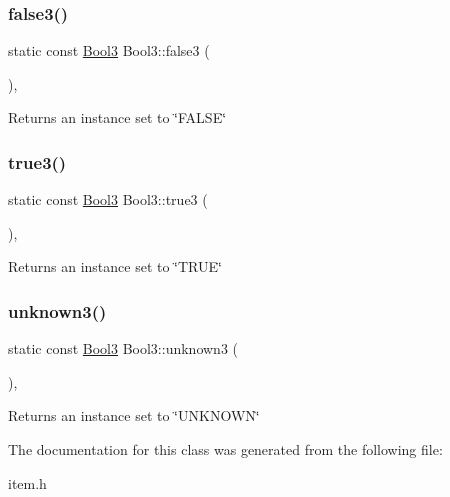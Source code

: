 \subsubsection{\texorpdfstring{false3()}{false3()}}
{\footnotesize\ttfamily static const \mbox{\hyperlink{classBool3}{Bool3}} Bool3\+::false3 (\begin{DoxyParamCaption}{ }\end{DoxyParamCaption})\hspace{0.3cm}{\ttfamily [inline]}, {\ttfamily [static]}}

\begin{DoxyReturn}{Returns}
an instance set to \char`\"{}\+F\+A\+L\+S\+E\char`\"{} 
\end{DoxyReturn}
\mbox{\label{classBool3_a4ac9552efeb411c1f93524e66028dce8}} 
\subsubsection{\texorpdfstring{true3()}{true3()}}
{\footnotesize\ttfamily static const \mbox{\hyperlink{classBool3}{Bool3}} Bool3\+::true3 (\begin{DoxyParamCaption}{ }\end{DoxyParamCaption})\hspace{0.3cm}{\ttfamily [inline]}, {\ttfamily [static]}}

\begin{DoxyReturn}{Returns}
an instance set to \char`\"{}\+T\+R\+U\+E\char`\"{} 
\end{DoxyReturn}
\mbox{\label{classBool3_a6b6cecbc55c466af91fe223e31f71995}} 
\subsubsection{\texorpdfstring{unknown3()}{unknown3()}}
{\footnotesize\ttfamily static const \mbox{\hyperlink{classBool3}{Bool3}} Bool3\+::unknown3 (\begin{DoxyParamCaption}{ }\end{DoxyParamCaption})\hspace{0.3cm}{\ttfamily [inline]}, {\ttfamily [static]}}

\begin{DoxyReturn}{Returns}
an instance set to \char`\"{}\+U\+N\+K\+N\+O\+W\+N\char`\"{} 
\end{DoxyReturn}


The documentation for this class was generated from the following file\+:\begin{DoxyCompactItemize}
\item 
item.\+h\end{DoxyCompactItemize}
